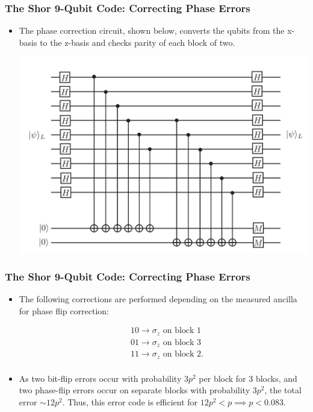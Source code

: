 \documentclass{beamer}
\begin{document}
\begin{frame}
    \frametitle{The Shor 9-Qubit Code: Correcting Phase Errors}
        \begin{itemize}
            \item The phase correction circuit, shown below, converts the qubits from the x-basis to the z-basis and checks parity of each block of two.
            \begin{center}
            \includegraphics[scale=0.5]{9qbphase.PNG}
            \end{center}
        \end{itemize}
\end{frame}


\begin{frame}
    \frametitle{The Shor 9-Qubit Code: Correcting Phase Errors}
        \begin{itemize}
            \item The following corrections are performed depending on the measured ancilla for phase flip correction:
            
            \begin{align*}
            &10 \rightarrow \sigma_z \text{ on block 1}\\
            &01 \rightarrow \sigma_z \text{ on block 3}\\
            &11 \rightarrow \sigma_z \text{ on block 2}.\\
           \end{align*}
           
           \item As two bit-flip errors occur with probability $3p^2$ per block for 3 blocks, and two phase-flip errors occur on separate blocks with probability $3p^2$, the total error $\sim 12p^2$. Thus, this error code is efficient for $12p^2 < p \implies p < 0.083$.
            
        \end{itemize}
\end{frame}
\end{document}

